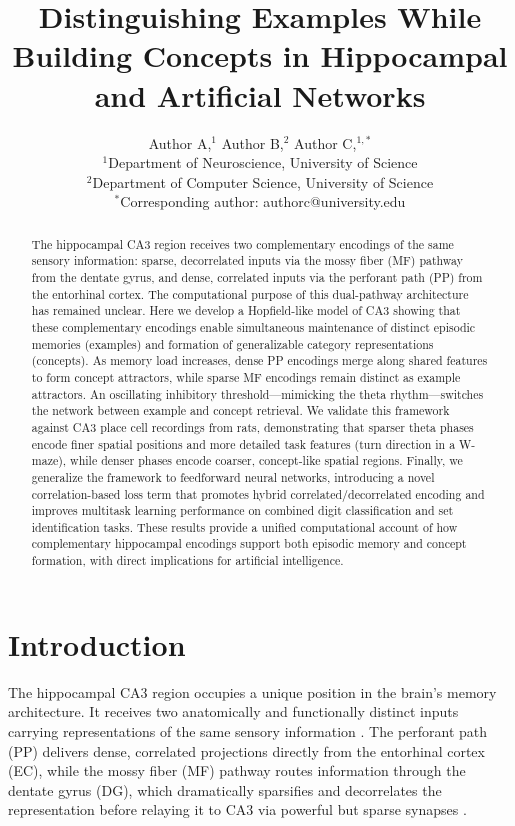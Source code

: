 \documentclass[11pt]{article}
\title{Distinguishing Examples While Building Concepts in Hippocampal and Artificial Networks}
\author{Author A,$^{1}$ Author B,$^{2}$ Author C,$^{1,*}$\\
\small $^{1}$Department of Neuroscience, University of Science\\
\small $^{2}$Department of Computer Science, University of Science\\
\small $^{*}$Corresponding author: authorc@university.edu}
\date{}
\begin{document}
\maketitle

\begin{abstract}
The hippocampal CA3 region receives two complementary encodings of the same sensory information: sparse, decorrelated inputs via the mossy fiber (MF) pathway from the dentate gyrus, and dense, correlated inputs via the perforant path (PP) from the entorhinal cortex. The computational purpose of this dual-pathway architecture has remained unclear. Here we develop a Hopfield-like model of CA3 showing that these complementary encodings enable simultaneous maintenance of distinct episodic memories (examples) and formation of generalizable category representations (concepts). As memory load increases, dense PP encodings merge along shared features to form concept attractors, while sparse MF encodings remain distinct as example attractors. An oscillating inhibitory threshold---mimicking the theta rhythm---switches the network between example and concept retrieval. We validate this framework against CA3 place cell recordings from rats, demonstrating that sparser theta phases encode finer spatial positions and more detailed task features (turn direction in a W-maze), while denser phases encode coarser, concept-like spatial regions. Finally, we generalize the framework to feedforward neural networks, introducing a novel correlation-based loss term that promotes hybrid correlated/decorrelated encoding and improves multitask learning performance on combined digit classification and set identification tasks. These results provide a unified computational account of how complementary hippocampal encodings support both episodic memory and concept formation, with direct implications for artificial intelligence.
\end{abstract}

\section{Introduction}

The hippocampal CA3 region occupies a unique position in the brain's memory architecture. It receives two anatomically and functionally distinct inputs carrying representations of the same sensory information \citep{treves1992computational}. The perforant path (PP) delivers dense, correlated projections directly from the entorhinal cortex (EC), while the mossy fiber (MF) pathway routes information through the dentate gyrus (DG), which dramatically sparsifies and decorrelates the representation before relaying it to CA3 via powerful but sparse synapses \citep{henze2002single, leutgeb2007pattern}.
\end{document}
